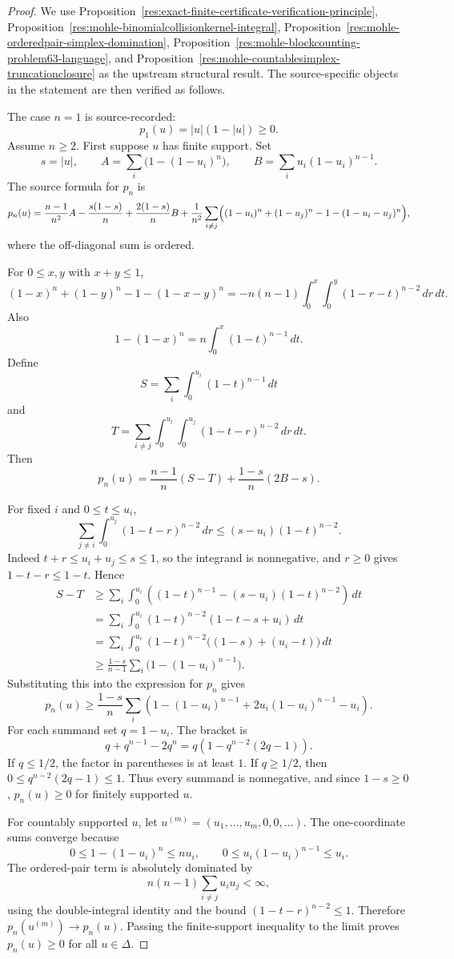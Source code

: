 \documentclass[11pt]{article}
\numberwithin{equation}{section}
\theoremstyle{definition}
\theoremstyle{remark}
\newcommand{\1}{\mathbf 1}
\begin{document}
\begin{proof}
We use Proposition~\ref{res:exact-finite-certificate-verification-principle}, Proposition~\ref{res:mohle-binomialcollisionkernel-integral}, Proposition~\ref{res:mohle-orderedpair-simplex-domination}, Proposition~\ref{res:mohle-blockcounting-problem63-language}, and Proposition~\ref{res:mohle-countablesimplex-truncationclosure} as the upstream structural result. The source-specific objects in the statement are then verified as follows.

The case \(n=1\) is source-recorded:
\[
p_1(u)=|u|(1-|u|)\ge0.
\]
Assume \(n\ge2\). First suppose \(u\) has finite support. Set
\[
s=|u|,\qquad
A=\sum_i\bigl(1-(1-u_i)^n\bigr),\qquad
B=\sum_i u_i(1-u_i)^{n-1}.
\]
The source formula for \(p_n\) is
\[
p_n(u)=\frac{n-1}{n^2}A-\frac{s(1-s)}n+\frac{2(1-s)}nB
+\frac1{n^2}\sum_{i\ne j}\Bigl((1-u_i)^n+(1-u_j)^n-1-(1-u_i-u_j)^n\Bigr),
\]
where the off-diagonal sum is ordered.

For \(0\le x,y\) with \(x+y\le1\),
\[
(1-x)^n+(1-y)^n-1-(1-x-y)^n
=-n(n-1)\int_0^x\int_0^y(1-r-t)^{n-2}\,dr\,dt.
\]
Also
\[
1-(1-x)^n=n\int_0^x(1-t)^{n-1}\,dt.
\]
Define
\[
S=\sum_i\int_0^{u_i}(1-t)^{n-1}\,dt
\]
and
\[
T=\sum_{i\ne j}\int_0^{u_i}\int_0^{u_j}(1-t-r)^{n-2}\,dr\,dt .
\]
Then
\[
p_n(u)=\frac{n-1}{n}(S-T)+\frac{1-s}{n}(2B-s).
\]

For fixed \(i\) and \(0\le t\le u_i\),
\[
\sum_{j\ne i}\int_0^{u_j}(1-t-r)^{n-2}\,dr
\le (s-u_i)(1-t)^{n-2}.
\]
Indeed \(t+r\le u_i+u_j\le s\le1\), so the integrand is nonnegative, and \(r\ge0\) gives \(1-t-r\le1-t\). Hence
\[
\begin{aligned}
S-T
&\ge \sum_i\int_0^{u_i}
\left((1-t)^{n-1}-(s-u_i)(1-t)^{n-2}\right)\,dt\\
&=\sum_i\int_0^{u_i}(1-t)^{n-2}(1-t-s+u_i)\,dt\\
&=\sum_i\int_0^{u_i}(1-t)^{n-2}\bigl((1-s)+(u_i-t)\bigr)\,dt\\
&\ge \frac{1-s}{n-1}\sum_i\bigl(1-(1-u_i)^{n-1}\bigr).
\end{aligned}
\]
Substituting this into the expression for \(p_n\) gives
\[
p_n(u)\ge
\frac{1-s}{n}\sum_i
\left(1-(1-u_i)^{n-1}+2u_i(1-u_i)^{n-1}-u_i\right).
\]
For each summand set \(q=1-u_i\). The bracket is
\[
q+q^{n-1}-2q^n
=q\left(1-q^{n-2}(2q-1)\right).
\]
If \(q\le1/2\), the factor in parentheses is at least \(1\). If \(q\ge1/2\), then \(0\le q^{n-2}(2q-1)\le1\). Thus every summand is nonnegative, and since \(1-s\ge0\), \(p_n(u)\ge0\) for finitely supported \(u\).

For countably supported \(u\), let \(u^{(m)}=(u_1,\ldots,u_m,0,0,\ldots)\). The one-coordinate sums converge because
\[
0\le 1-(1-u_i)^n\le n u_i,\qquad 0\le u_i(1-u_i)^{n-1}\le u_i.
\]
The ordered-pair term is absolutely dominated by
\[
n(n-1)\sum_{i\ne j}u_i u_j<\infty,
\]
using the double-integral identity and the bound \((1-t-r)^{n-2}\le1\). Therefore \(p_n(u^{(m)})\to p_n(u)\). Passing the finite-support inequality to the limit proves \(p_n(u)\ge0\) for all \(u\in\Delta\).


\end{proof}
\end{document}
